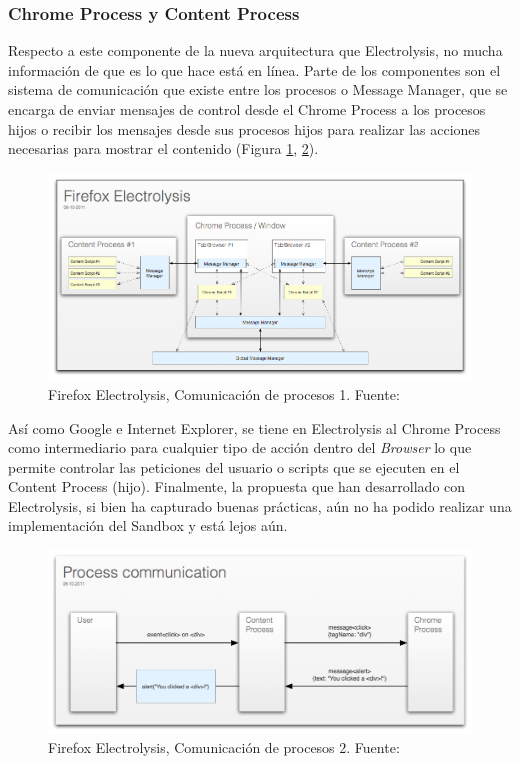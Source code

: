     \subsubsection{Chrome Process y Content Process}
    Respecto a este componente de la nueva arquitectura que Electrolysis, no mucha información de que es lo que hace está en línea. Parte de los componentes son el sistema de comunicación que existe entre los procesos o Message Manager, que se encarga de enviar mensajes de control desde el Chrome Process a los procesos hijos o recibir los mensajes desde sus procesos hijos para realizar las acciones necesarias para mostrar el contenido (Figura \ref{fig:ChromePComm1}, \ref{fig:ChromePComm2}).
        \begin{figure}[h!t]
            \centering
            \includegraphics[width=1\textwidth]{figures/electrolysis.png}
            \caption{Firefox Electrolysis, Comunicación de procesos 1. Fuente: \cite{Firefox101}}
            \label{fig:ChromePComm1}
        \end{figure}

    Así como Google e Internet Explorer, se tiene en Electrolysis al Chrome Process como intermediario para cualquier tipo de acción dentro del \textit{Browser} lo que permite controlar las peticiones del usuario o scripts que se ejecuten en el Content Process (hijo). Finalmente, la propuesta que han desarrollado con Electrolysis, si bien ha capturado buenas prácticas, aún no ha podido realizar una implementación del Sandbox y está lejos aún.

        \begin{figure}[h!t]
            \centering
            \includegraphics[width=1\textwidth]{figures/e10s-processes.png}
            \caption{Firefox Electrolysis, Comunicación de procesos 2. Fuente: \cite{Firefox101}}
            \label{fig:ChromePComm2}
        \end{figure}

